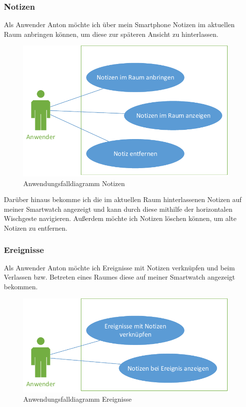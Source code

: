 \subsubsection{Notizen}
Als Anwender Anton möchte ich über mein Smartphone Notizen im aktuellen Raum anbringen können, um diese zur späteren Ansicht zu hinterlassen.

\begin{figure}[H]
\centering
\includegraphics[width=0.7\linewidth]{Bilder/UseCase-Notizen}
\caption{Anwendungsfalldiagramm Notizen}
\label{fig:UseCase-Notizen}
\end{figure}

Darüber hinaus bekomme ich die im aktuellen Raum hinterlassenen Notizen auf meiner Smartwatch angezeigt und kann durch diese mithilfe der horizontalen Wischgeste navigieren. Außerdem möchte ich Notizen löschen können, um alte Notizen zu entfernen.

\subsubsection{Ereignisse}
Als Anwender Anton möchte ich Ereignisse mit Notizen verknüpfen und beim Verlassen bzw. Betreten eines Raumes diese auf meiner Smartwatch angezeigt bekommen.

\begin{figure}[H]
\centering
\includegraphics[width=0.7\linewidth]{Bilder/UseCase-Ereignisse}
\caption{Anwendungsfalldiagramm Ereignisse}
\label{fig:UseCase-Ereignisse}
\end{figure}


